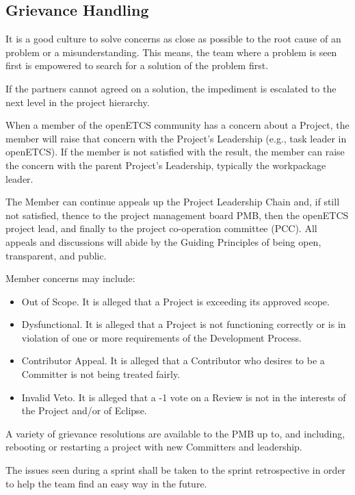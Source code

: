 \documentclass{template/openetcs_article}
\begin{document}
\subsection{Grievance Handling}

It is a good culture to solve concerns as close as possible to the root cause of an problem or a misunderstanding. This means, the team where a problem is seen first is empowered to search for a solution of the problem first.

If the partners cannot agreed on a solution, the impediment is escalated to the next level in the project hierarchy. 

When a member of the openETCS community has a concern about a Project, the  member will raise that concern with the Project's Leadership (e.g., task leader in openETCS). If the member is not satisfied with the result, the member can raise the concern with the parent Project's Leadership, typically the workpackage leader.

The Member can continue appeals up the Project Leadership Chain and, if still not satisfied, thence to the project management board PMB, then the openETCS project lead, and finally to the project co-operation committee (PCC). All appeals and discussions will abide by the Guiding Principles of being open, transparent, and public.

Member concerns may include:
\begin {itemize}
\item Out of Scope. It is alleged that a Project is exceeding its approved scope.

\item Dysfunctional. It is alleged that a Project is not functioning correctly or is in violation of one or more requirements of the Development Process.\

\item Contributor Appeal. It is alleged that a Contributor who desires to be a Committer is not being treated fairly.

\item Invalid Veto. It is alleged that a -1 vote on a Review is not in the interests of the Project and/or of Eclipse.
\end{itemize}

A variety of grievance resolutions are available to the PMB up to, and including, rebooting or restarting a project with new Committers and leadership.

The issues seen during a sprint shall be taken to the sprint retrospective in order to help the team find an easy way in the future.
\end{document}
